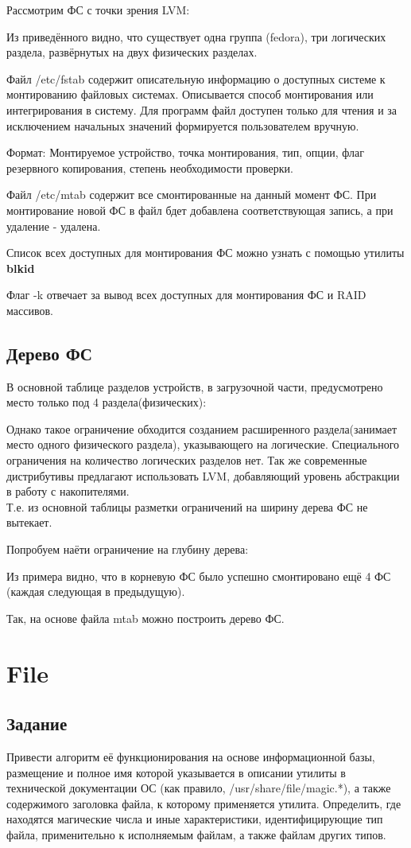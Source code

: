 \documentclass[a4paper]{article}
\begin{document}
Рассмотрим ФС с точки зрения LVM:

Из приведённого видно, что существует одна группа (fedora), три логических раздела, развёрнутых на двух физических разделах.

Файл /etc/fstab содержит описательную информацию о доступных системе к монтированию файловых системах. Описывается способ монтирования или интегрирования в систему. Для программ файл доступен только для чтения и за исключением начальных значений формируется пользователем вручную.

Формат: Монтируемое устройство, точка монтирования, тип, опции, флаг резервного копирования, степень необходимости проверки.

Файл /etc/mtab содержит все смонтированные на данный момент ФС. При монтирование новой ФС в файл бдет добавлена соответствующая запись, а при удаление - удалена.


Список всех доступных для монтирования ФС можно узнать с помощью утилиты \textbf{blkid}

Флаг -k отвечает за вывод всех доступных для монтирования ФС и RAID массивов.
\subsection{ Дерево ФС} В основной таблице разделов устройств, в загрузочной части, предусмотрено место только под 4 раздела(физических):

Однако такое ограничение обходится созданием расширенного раздела(занимает место одного физического раздела), указывающего на логические. Специального ограничения на количество логических разделов нет. Так же современные дистрибутивы предлагают использовать LVM, добавляющий уровень абстракции в работу с накопителями.\\

Т.е. из основной таблицы разметки ограничений на ширину дерева ФС не вытекает.

Попробуем наёти ограничение на глубину дерева:

Из примера видно, что в корневую ФС было успешно смонтировано ещё 4 ФС (каждая следующая в предыдущую).

Так, на основе файла mtab можно построить дерево ФС.
\section{ File}  
\subsection{ Задание} Привести алгоритм её функционирования на основе информационной базы, размещение и полное имя которой указывается в описании утилиты в технической документации ОС (как правило, /usr/share/file/magic.*), а также содержимого заголовка файла, к которому применяется утилита. Определить, где находятся магические числа и иные характеристики, идентифицирующие тип файла, применительно к исполняемым файлам, а также файлам других типов. 
\end{document}
